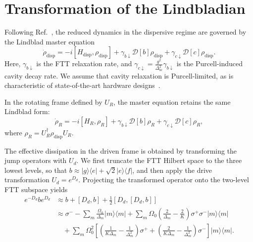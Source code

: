 \section*{Transformation of the Lindbladian}
\label{subsec:Lindblad_transfer}

Following Ref.~\cite{cqedreview2021}, the reduced dynamics in the dispersive regime are governed by the Lindblad master equation
\begin{equation}
\label{eq:Lindblad_disp}
    \dot{\rho}_{\mathrm{disp}} = -i[H_{\mathrm{disp}}, \rho_{\mathrm{disp}}] + \gamma_{b\downarrow} \mathcal{D}[b]\rho_{\mathrm{disp}} + \gamma_{c\downarrow} \mathcal{D}[c]\rho_{\mathrm{disp}}.
\end{equation}
Here, $\gamma_{b\downarrow}$ is the FTT relaxation rate, and $\gamma_{c\downarrow} = \frac{g^2}{\Delta_{bc}^2}\gamma_{b\downarrow}$ is the Purcell-induced cavity decay rate. We assume that cavity relaxation is Purcell-limited, as is characteristic of state-of-the-art hardware designs~\cite{longcoherence5}.

In the rotating frame defined by $U_R$, the master equation retains the same Lindblad form:
\begin{equation}
\label{eq:LindbladR}
    \dot{\rho}_R = -i[H_R, \rho_R] + \gamma_{b\downarrow} \mathcal{D}[b]\rho_R + \gamma_{c\downarrow} \mathcal{D}[c]\rho_R,
\end{equation}
where $\rho_R = U_R^\dagger \rho_{\mathrm{disp}} U_R$.

The effective dissipation in the driven frame is obtained by transforming the jump operators with $U_d$. We first truncate the FTT Hilbert space to the three lowest levels, so that $b \approx |g\rangle\langle e| + \sqrt{2}|e\rangle\langle f|$, and then apply the drive transformation $U_d = e^{D_d}$. Projecting the transformed operator onto the two-level FTT subspace yields
\begin{align}
\label{eq:transformb}
    e^{-D_d} b e^{D_d}
    &\approx b + [D_d, b] + \frac{1}{2}[D_d, [D_d, b]] \nonumber \\
    &\approx \sigma^- - \sum_m \frac{\Omega_0}{\Delta_m} |m\rangle\langle m| + \sum_m \Omega_0 \left( \frac{2}{\Delta_m} - \frac{2}{K} \right) \sigma^+ \sigma^- |m\rangle\langle m| \nonumber \\
    &\quad + \sum_m \Omega_0^2 \left[ \left( \frac{1}{K \Delta_m} - \frac{1}{\Delta_m^2} \right) \sigma^+ + \left( \frac{2}{K \Delta_m} - \frac{1}{\Delta_m^2} \right) \sigma^- \right] |m\rangle\langle m|.
\end{align}

